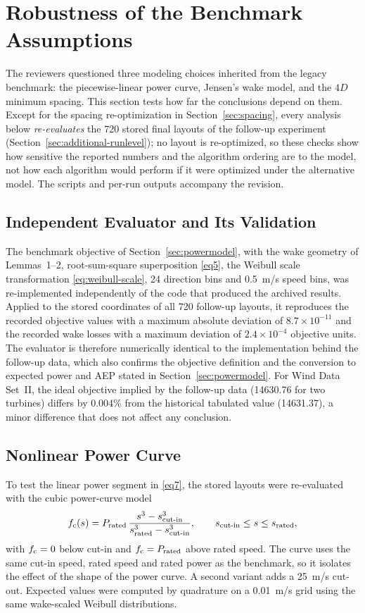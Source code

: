 \section{Robustness of the Benchmark Assumptions}
\label{sec:robustness}
The reviewers questioned three modeling choices inherited from the legacy benchmark: the piecewise-linear power curve, Jensen's wake model, and the $4D$ minimum spacing. This section tests how far the conclusions depend on them. Except for the spacing re-optimization in Section~\ref{sec:spacing}, every analysis below \emph{re-evaluates} the 720 stored final layouts of the follow-up experiment (Section~\ref{sec:additional-runlevel}); no layout is re-optimized, so these checks show how sensitive the reported numbers and the algorithm ordering are to the model, not how each algorithm would perform if it were optimized under the alternative model. The scripts and per-run outputs accompany the revision.

\subsection{Independent Evaluator and Its Validation}
\label{sec:validation}
The benchmark objective of Section~\ref{sec:powermodel}, with the wake geometry of Lemmas~1--2, root-sum-square superposition \eqref{eq5}, the Weibull scale transformation \eqref{eq:weibull-scale}, 24 direction bins and 0.5~m/s speed bins, was re-implemented independently of the code that produced the archived results. Applied to the stored coordinates of all 720 follow-up layouts, it reproduces the recorded objective values with a maximum absolute deviation of $8.7\times10^{-11}$ and the recorded wake losses with a maximum deviation of $2.4\times10^{-4}$ objective units. The evaluator is therefore numerically identical to the implementation behind the follow-up data, which also confirms the objective definition and the conversion to expected power and AEP stated in Section~\ref{sec:powermodel}. For Wind Data Set~II, the ideal objective implied by the follow-up data (14630.76 for two turbines) differs by 0.004\% from the historical tabulated value (14631.37), a minor difference that does not affect any conclusion.

\subsection{Nonlinear Power Curve}
\label{sec:powercurve}
To test the linear power segment in \eqref{eq7}, the stored layouts were re-evaluated with the cubic power-curve model~\cite{Carrillo2013}
\[
f_{\rm c}(s)=P_{\text{rated}}\,\frac{s^3-s_{\text{cut-in}}^3}{s_{\text{rated}}^3-s_{\text{cut-in}}^3},\qquad s_{\text{cut-in}}\le s\le s_{\text{rated}},
\]
with $f_{\rm c}=0$ below cut-in and $f_{\rm c}=P_{\text{rated}}$ above rated speed. The curve uses the same cut-in speed, rated speed and rated power as the benchmark, so it isolates the effect of the shape of the power curve. A second variant adds a 25~m/s cut-out. Expected values were computed by quadrature on a 0.01~m/s grid using the same wake-scaled Weibull distributions.

